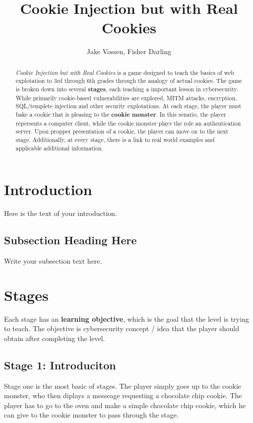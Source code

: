 \documentclass{article}
\begin{document}
\title{Cookie Injection but with Real Cookies}
\author{Jake Vossen, Fisher Darling}

\maketitle

\begin{abstract}
\textit{Cookie Injection but with Real Cookies} is a game designed to
teach the basics of web explotation to 3rd through 6th grades through
the analogy of actual cookies. The game is broken down into several
\textbf{stages}, each teaching a important lesson in
cybersecurity. While primarily cookie-based vulnerabilities are
explored, MITM attacks, encryption, SQL/templete injection and other
security explotations. At each stage, the player must bake a cookie
that is pleasing to the \textbf{cookie monster}. In this senario, the
player repersents a computer client, while the cookie monster plays
the role an authentication server. Upon propper presentation of a
cookie, the player can move on to the next stage. Additionally, at
every stage, there is a link to real world examples and applicable
additional information.
\end{abstract}

\section{Introduction}
Here is the text of your introduction.

\subsection{Subsection Heading Here}
Write your subsection text here.

\section{Stages}

Each stage has an \textbf{learning objective}, which is the goal that the level
is trying to teach. The objective is cybersecurity concept / idea that
the player should obtain after completing the level.

\subsection{Stage 1: Introduciton}

Stage one is the most basic of stages. The player simply goes up to
the cookie monster, who then diplays a messeage requesting a chocolate
chip cookie. The player has to go to the oven and make a simple
chocolate chip cookie, which he can give to the cookie monster to pass
through the stage.
\end{document}
